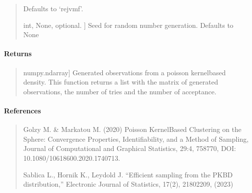 \documentclass[letterpaper,10pt,english,openany,oneside]{sphinxmanual}
\begin{document}
\begin{fulllineitems}
\begin{quote}
\begin{description}
\begin{itemize}
\begin{description}
\end{description}

\end{itemize}

\sphinxAtStartPar
Defaults to ‘rejvmf’.

\sphinxlineitem{random\_state}{[}int, None, optional. {]}
\sphinxAtStartPar
Seed for random number generation. Defaults to None

\end{description}
\end{quote}


\paragraph{Returns}
\label{\detokenize{api_reference/generated/QuadratiK.spherical_clustering.PKBD:id2}}\begin{quote}
\begin{description}
\sphinxlineitem{samples}{[}numpy.ndarray{]}
\sphinxAtStartPar
Generated observations from a poisson kernel\sphinxhyphen{}based density.
This function returns a list with the matrix of generated observations, the 
number of tries and the number of acceptance.

\end{description}
\end{quote}


\paragraph{References}
\label{\detokenize{api_reference/generated/QuadratiK.spherical_clustering.PKBD:references}}\begin{quote}

\sphinxAtStartPar
Golzy M. \& Markatou M. (2020) Poisson Kernel\sphinxhyphen{}Based 
Clustering on the Sphere: Convergence Properties, Identifiability, 
and a Method of Sampling, Journal of Computational and Graphical Statistics, 
29:4, 758\sphinxhyphen{}770, DOI: 10.1080/10618600.2020.1740713.

\sphinxAtStartPar
Sablica L., Hornik K., Leydold J. “Efficient sampling from the PKBD 
distribution,” Electronic Journal of Statistics, 17(2), 2180\sphinxhyphen{}2209, (2023)
\end{quote}



\end{fulllineitems}
\end{document}
